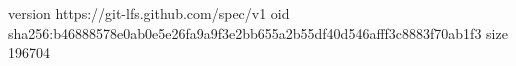 version https://git-lfs.github.com/spec/v1
oid sha256:b46888578e0ab0e5e26fa9a9f3e2bb655a2b55df40d546afff3c8883f70ab1f3
size 196704
